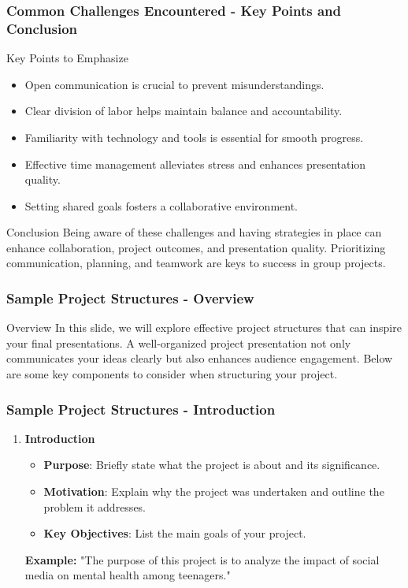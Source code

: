\documentclass[aspectratio=169]{beamer}
\begin{document}
\begin{frame}[fragile]
    \frametitle{Common Challenges Encountered - Key Points and Conclusion}
    \begin{block}{Key Points to Emphasize}
        \begin{itemize}
            \item Open communication is crucial to prevent misunderstandings.
            \item Clear division of labor helps maintain balance and accountability.
            \item Familiarity with technology and tools is essential for smooth progress.
            \item Effective time management alleviates stress and enhances presentation quality.
            \item Setting shared goals fosters a collaborative environment.
        \end{itemize}
    \end{block}

    \begin{block}{Conclusion}
        Being aware of these challenges and having strategies in place can enhance collaboration, project outcomes, and presentation quality. Prioritizing communication, planning, and teamwork are keys to success in group projects.
    \end{block}
\end{frame}

\begin{frame}[fragile]
    \frametitle{Sample Project Structures - Overview}
    \begin{block}{Overview}
        In this slide, we will explore effective project structures that can inspire your final presentations. A well-organized project presentation not only communicates your ideas clearly but also enhances audience engagement. Below are some key components to consider when structuring your project.
    \end{block}
\end{frame}

\begin{frame}[fragile]
    \frametitle{Sample Project Structures - Introduction}
    \begin{enumerate}
        \item \textbf{Introduction}
        \begin{itemize}
            \item \textbf{Purpose}: Briefly state what the project is about and its significance.
            \item \textbf{Motivation}: Explain why the project was undertaken and outline the problem it addresses.
            \item \textbf{Key Objectives}: List the main goals of your project.
        \end{itemize}
        \textbf{Example:} "The purpose of this project is to analyze the impact of social media on mental health among teenagers."
    \end{enumerate}
\end{frame}
\end{document}
